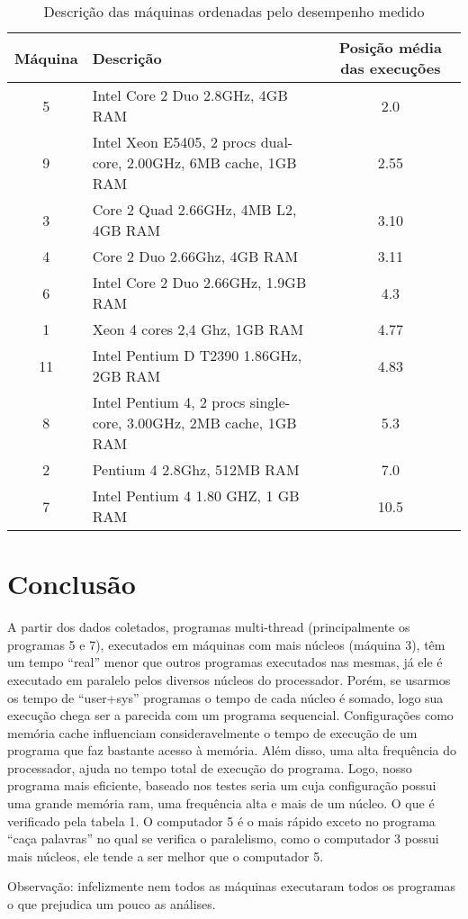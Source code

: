 \documentclass[10pt,a4paper]{article}
\begin{document}
\begin{table}[h!]
\caption{Descrição das máquinas ordenadas pelo desempenho medido}
\begin{tabular}{clc}
\hline
Máquina & Descrição & Posição média das execuções\\
\hline
5	&	Intel Core 2 Duo 2.8GHz, 4GB RAM & 2.0\\
9 &	Intel Xeon E5405, 2 procs dual-core, 2.00GHz, 6MB cache, 1GB
RAM & 2.55\\
3	&	Core 2 Quad 2.66GHz, 4MB L2, 4GB RAM & 3.10\\
4	&	Core 2 Duo 2.66Ghz, 4GB RAM & 3.11\\
6	&	Intel Core 2 Duo 2.66GHz, 1.9GB RAM & 4.3 \\
1	&	  Xeon 4 cores 2,4 Ghz, 1GB RAM & 4.77\\
11 &	Intel Pentium D T2390 1.86GHz, 2GB RAM & 4.83\\
8 &	Intel Pentium 4, 2 procs single-core, 3.00GHz, 2MB cache, 1GB
RAM & 5.3\\
2	&	Pentium 4 2.8Ghz, 512MB RAM & 7.0\\
7	&	Intel Pentium 4 1.80 GHZ, 1 GB RAM & 10.5\\
\hline
\end{tabular}
\end{table}

\vspace{-5mm}
\section{Conclusão}
A partir dos dados coletados, programas multi-thread (principalmente
os programas 5 e 7), executados em máquinas com mais núcleos (máquina 3), têm um tempo
``real'' menor que outros programas executados nas mesmas, já ele é executado em paralelo pelos
diversos núcleos do processador. Porém, se usarmos os tempo de ``user+sys''
programas o tempo de cada núcleo é somado, logo sua execução chega ser
a parecida com um programa sequencial.
Configurações como memória cache influenciam consideravelmente o tempo de
execução de um programa que faz bastante acesso à memória. Além disso,
 uma alta frequência do processador, ajuda no tempo total de execução
do programa.
Logo, nosso programa mais eficiente, baseado nos testes seria um cuja
configuração possui uma grande memória ram, uma frequência alta e mais
de um núcleo. O que é verificado pela tabela 1. O computador 5 é o
mais rápido exceto no programa ``caça palavras'' no qual se verifica o
paralelismo, como o computador 3 possui mais núcleos, ele tende a ser
melhor que o computador 5.

Observação: infelizmente nem todos as máquinas executaram todos os
programas o que prejudica um pouco as análises.
%
%  
\end{document}
